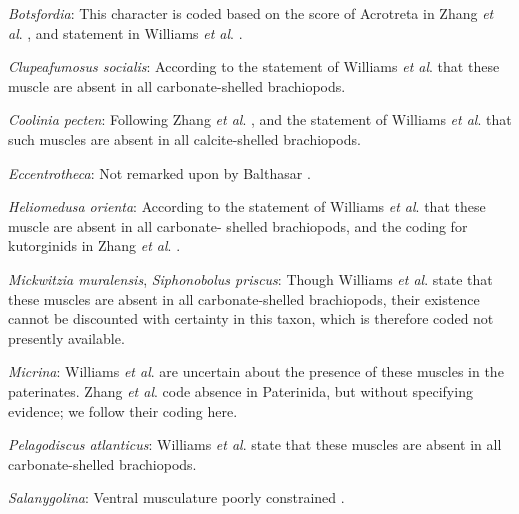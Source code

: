 \documentclass[openany]{book}
\theoremstyle{definition}
\theoremstyle{definition}
\theoremstyle{definition}
\theoremstyle{remark}
\begin{document}
\hypertarget{Botsfordia-coding-78}{}
\emph{Botsfordia}: This character is coded based on the score of
Acrotreta in Zhang \emph{et al}. \citeyearpar{Zhang2014Anearly}, and
statement in Williams \emph{et al}.
\citeyearpar[P.32]{Williams2000LinguliformeaCraniiformea}.

\hypertarget{Clupeafumosus_socialis-coding-78}{}
\emph{Clupeafumosus socialis}: According to the statement of Williams
\emph{et al}. \citeyearpar[p.~32]{Williams2000LinguliformeaCraniiformea}
that these muscle are absent in all carbonate-shelled brachiopods.

\hypertarget{Coolinia_pecten-coding-78}{}
\emph{Coolinia pecten}: Following Zhang \emph{et al}.
\citeyearpar{Zhang2014Anearly}, and the statement of Williams \emph{et
al}. \citeyearpar{Williams2000LinguliformeaCraniiformea} that such
muscles are absent in all calcite-shelled brachiopods.

\hypertarget{Eccentrotheca-coding-78}{}
\emph{Eccentrotheca}: Not remarked upon by Balthasar
\citeyearpar{Balthasar2009Thebrachiopod}.

\hypertarget{Heliomedusa_orienta-coding-78}{}
\emph{Heliomedusa orienta}: According to the statement of Williams
\emph{et al}. \citeyearpar[p.~32]{Williams2000LinguliformeaCraniiformea}
that these muscle are absent in all carbonate- shelled brachiopods, and
the coding for kutorginids in Zhang \emph{et al}.
\citeyearpar{Zhang2014Anearly}.

\hypertarget{Mickwitzia_muralensis-coding-78}{}
\emph{Mickwitzia muralensis}, \emph{Siphonobolus priscus}: Though
Williams \emph{et al}.
\citeyearpar[p.~32]{Williams2000LinguliformeaCraniiformea} state that
these muscles are absent in all carbonate-shelled brachiopods, their
existence cannot be discounted with certainty in this taxon, which is
therefore coded not presently available.

\hypertarget{Micrina-coding-78}{}
\emph{Micrina}: Williams \emph{et al}.
\citeyearpar[p.~32]{Williams2000LinguliformeaCraniiformea} are uncertain
about the presence of these muscles in the paterinates. Zhang \emph{et
al}. \citeyearpar{Zhang2014Anearly} code absence in Paterinida, but
without specifying evidence; we follow their coding here.

\hypertarget{Pelagodiscus_atlanticus-coding-78}{}
\emph{Pelagodiscus atlanticus}: Williams \emph{et al}.
\citeyearpar[p.~32]{Williams2000LinguliformeaCraniiformea} state that
these muscles are absent in all carbonate-shelled brachiopods.

\hypertarget{Salanygolina-coding-78}{}
\emph{Salanygolina}: Ventral musculature poorly constrained
\citep{Williams2000LinguliformeaCraniiformea, Popov2009Earlyontogeny}.
\end{document}
